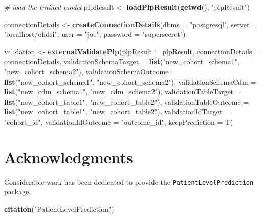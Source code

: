 \documentclass[]{article}
\newenvironment{Shaded}{\begin{snugshade}}{\end{snugshade}}
\newcommand{\KeywordTok}[1]{\textcolor[rgb]{0.13,0.29,0.53}{\textbf{#1}}}
\newcommand{\DataTypeTok}[1]{\textcolor[rgb]{0.13,0.29,0.53}{#1}}
\newcommand{\StringTok}[1]{\textcolor[rgb]{0.31,0.60,0.02}{#1}}
\newcommand{\CommentTok}[1]{\textcolor[rgb]{0.56,0.35,0.01}{\textit{#1}}}
\newcommand{\NormalTok}[1]{#1}
\begin{document}
\begin{Shaded}
\begin{Highlighting}[]
\CommentTok{# load the trained model}
\NormalTok{plpResult <-}\StringTok{ }\KeywordTok{loadPlpResult}\NormalTok{(}\KeywordTok{getwd}\NormalTok{(), }\StringTok{"plpResult"}\NormalTok{)}

\NormalTok{connectionDetails <-}\StringTok{ }\KeywordTok{createConnectionDetails}\NormalTok{(}\DataTypeTok{dbms =} \StringTok{"postgresql"}\NormalTok{, }\DataTypeTok{server =} \StringTok{"localhost/ohdsi"}\NormalTok{, }
    \DataTypeTok{user =} \StringTok{"joe"}\NormalTok{, }\DataTypeTok{password =} \StringTok{"supersecret"}\NormalTok{)}

\NormalTok{validation <-}\StringTok{ }\KeywordTok{externalValidatePlp}\NormalTok{(}\DataTypeTok{plpResult =}\NormalTok{ plpResult, }\DataTypeTok{connectionDetails =}\NormalTok{ connectionDetails, }
    \DataTypeTok{validationSchemaTarget =} \KeywordTok{list}\NormalTok{(}\StringTok{"new_cohort_schema1"}\NormalTok{, }\StringTok{"new_cohort_schema2"}\NormalTok{), }
    \DataTypeTok{validationSchemaOutcome =} \KeywordTok{list}\NormalTok{(}\StringTok{"new_cohort_schema1"}\NormalTok{, }\StringTok{"new_cohort_schema2"}\NormalTok{), }
    \DataTypeTok{validationSchemaCdm =} \KeywordTok{list}\NormalTok{(}\StringTok{"new_cdm_schema1"}\NormalTok{, }\StringTok{"new_cdm_schema2"}\NormalTok{), }\DataTypeTok{validationTableTarget =} \KeywordTok{list}\NormalTok{(}\StringTok{"new_cohort_table1"}\NormalTok{, }
        \StringTok{"new_cohort_table2"}\NormalTok{), }\DataTypeTok{validationTableOutcome =} \KeywordTok{list}\NormalTok{(}\StringTok{"new_cohort_table1"}\NormalTok{, }
        \StringTok{"new_cohort_table2"}\NormalTok{), }\DataTypeTok{validationIdTarget =} \StringTok{"cohort_id"}\NormalTok{, }\DataTypeTok{validationIdOutcome =} \StringTok{"outcome_id"}\NormalTok{, }
    \DataTypeTok{keepPrediction =}\NormalTok{ T)}
\end{Highlighting}
\end{Shaded}

\newpage

\section{Acknowledgments}\label{acknowledgments}

Considerable work has been dedicated to provide the
\texttt{PatientLevelPrediction} package.

\begin{Shaded}
\begin{Highlighting}[]
\KeywordTok{citation}\NormalTok{(}\StringTok{"PatientLevelPrediction"}\NormalTok{)}
\end{Highlighting}
\end{Shaded}
\end{document}
